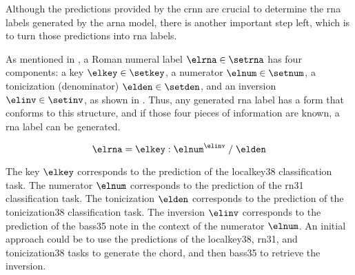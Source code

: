 
Although the predictions provided by the \gls{crnn} are
crucial to determine the \gls{rna} labels generated by the
\gls{arna} model, there is another important step left,
which is to turn those predictions into \gls{rna} labels.

As mentioned in
, a Roman
numeral label $\elrna \in \setrna$ has four components: a
key $\elkey \in \setkey$, a numerator $\elnum \in \setnum$,
a tonicization (denominator) $\elden \in \setden$, and an
inversion $\elinv \in \setinv$, as shown in .
Thus, any generated \gls{rna} label has a form that conforms
to this structure, and if those four pieces of information
are known, a \gls{rna} label can be generated.

\begin{equation}
    \label{eq:rna}
    \elrna = \elkey : \elnum^{\elinv} \; / \; \elden
\end{equation}



The key $\elkey$ corresponds to the prediction of the
\gls{localkey38} classification task. The numerator $\elnum$
corresponds to the prediction of the \gls{rn31}
classification task. The tonicization $\elden$ corresponds
to the prediction of the \gls{tonicization38} classification
task. The inversion $\elinv$ corresponds to the prediction
of the \gls{bass35} note in the context of the numerator
$\elnum$. An initial approach could be to use the
predictions of the \gls{localkey38}, \gls{rn31}, and
\gls{tonicization38} tasks to generate the chord, and then
\gls{bass35} to retrieve the inversion.



